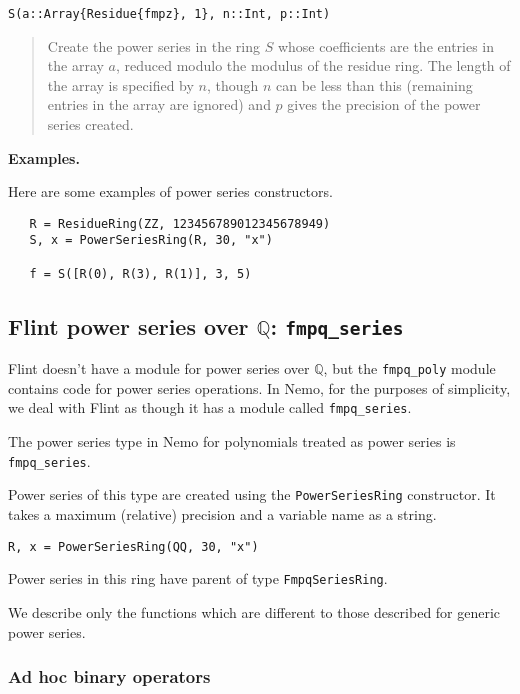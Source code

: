 \documentclass[a4paper,10pt]{article}
\newcommand{\Q}{\mathbb{Q}}
\newcommand{\code}{\lstinline}
\newcommand{\desc}[1]{\vspace{-3mm}\begin{quote}#1\end{quote}}
\begin{document}
{{\begin{lstlisting}
S(a::Array{Residue{fmpz}, 1}, n::Int, p::Int)
\end{lstlisting}

\desc{Create the power series in the ring $S$ whose coefficients are the entries in
the array $a$, reduced modulo the modulus of the residue ring. The length of the
array is specified by $n$, though $n$ can be less than this (remaining entries in the
array are ignored) and $p$ gives the precision of the power series created.}

\textbf{Examples.}

Here are some examples of power series constructors.

\begin{lstlisting}
   R = ResidueRing(ZZ, 123456789012345678949)
   S, x = PowerSeriesRing(R, 30, "x")

   f = S([R(0), R(3), R(1)], 3, 5)
\end{lstlisting}

\subsection{Flint power series over $\Q$: \code{fmpq_series}}

Flint doesn't have a module for power series over $\Q$, but the \code{fmpq_poly}
module contains code for power series operations. In Nemo, for the purposes of
simplicity, we deal with Flint as though it has a module called \code{fmpq_series}.

The power series type in Nemo for polynomials treated as power series is
\code{fmpq_series}. 

Power series of this type are created using the \code{PowerSeriesRing} constructor.
It takes a maximum (relative) precision and a variable name as a string.

\begin{lstlisting}
R, x = PowerSeriesRing(QQ, 30, "x")
\end{lstlisting}

Power series in this ring have parent of type \code{FmpqSeriesRing}.

We describe only the functions which are different to those described for generic
power series.

\subsubsection{Ad hoc binary operators}

}}
\end{document}
